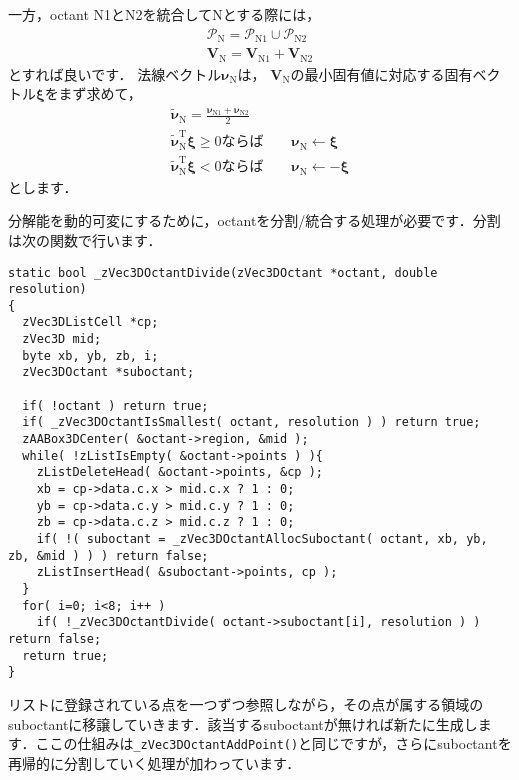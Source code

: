 ﻿\documentclass[a4paper]{jsarticle}
\begin{document}
一方，octant N1とN2を統合してNとする際には，
\begin{align*}
\mathcal{P}_{\mathrm{N}}=\mathcal{P}_{\mathrm{N}1}\cup\mathcal{P}_{\mathrm{N}2}
\\
\bm{V}_{\mathrm{N}}=\bm{V}_{\mathrm{N}1}+\bm{V}_{\mathrm{N}2}
\end{align*}
とすれば良いです．
法線ベクトル$\bm{\nu}_{\mathrm{N}}$は，
$\bm{V}_{\mathrm{N}}$の最小固有値に対応する固有ベクトル$\bm{\xi}$をまず求めて，
\begin{align*}
\tilde{\bm{\nu}}_{\mathrm{N}}=\frac{\bm{\nu}_{\mathrm{N}1}+\bm{\nu}_{\mathrm{N}2}}{2}
\\
\mbox{$\tilde{\bm{\nu}}_{\mathrm{N}}^{\mathrm{T}}\bm{\xi}\geq 0$ならば}\qquad\bm{\nu}_{\mathrm{N}}\leftarrow\bm{\xi}
\\
\mbox{$\tilde{\bm{\nu}}_{\mathrm{N}}^{\mathrm{T}}\bm{\xi}< 0$ならば}\qquad\bm{\nu}_{\mathrm{N}}\leftarrow-\bm{\xi}
\end{align*}
とします．








分解能を動的可変にするために，octantを分割/統合する処理が必要です．分割は次の関数で行います．
\begin{screen}
\begin{verbatim}
static bool _zVec3DOctantDivide(zVec3DOctant *octant, double resolution)
{
  zVec3DListCell *cp;
  zVec3D mid;
  byte xb, yb, zb, i;
  zVec3DOctant *suboctant;

  if( !octant ) return true;
  if( _zVec3DOctantIsSmallest( octant, resolution ) ) return true;
  zAABox3DCenter( &octant->region, &mid );
  while( !zListIsEmpty( &octant->points ) ){
    zListDeleteHead( &octant->points, &cp );
    xb = cp->data.c.x > mid.c.x ? 1 : 0;
    yb = cp->data.c.y > mid.c.y ? 1 : 0;
    zb = cp->data.c.z > mid.c.z ? 1 : 0;
    if( !( suboctant = _zVec3DOctantAllocSuboctant( octant, xb, yb, zb, &mid ) ) ) return false;
    zListInsertHead( &suboctant->points, cp );
  }
  for( i=0; i<8; i++ )
    if( !_zVec3DOctantDivide( octant->suboctant[i], resolution ) ) return false;
  return true;
}
\end{verbatim}
\end{screen}

リストに登録されている点を一つずつ参照しながら，その点が属する領域のsuboctantに移譲していきます．該当するsuboctantが無ければ新たに生成します．ここの仕組みは\verb|_zVec3DOctantAddPoint()|と同じですが，さらにsuboctantを再帰的に分割していく処理が加わっています．
\end{document}
